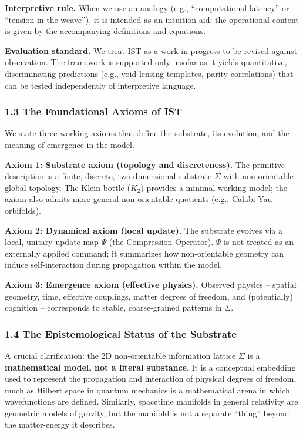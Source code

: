 \documentclass[
]{article}
\begin{document}
\textbf{Interpretive rule.} When we use an analogy (e.g.,
``computational latency'' or ``tension in the weave''), it is intended
as an intuition aid; the operational content is given by the
accompanying definitions and equations.

\textbf{Evaluation standard.} We treat IST as a work in progress to be
revised against observation. The framework is supported only insofar as
it yields quantitative, discriminating predictions (e.g., void-lensing
templates, parity correlations) that can be tested independently of
interpretive language.

\subsubsection{1.3 The Foundational Axioms of
IST}\label{the-foundational-axioms-of-ist}

We state three working axioms that define the substrate, its evolution,
and the meaning of emergence in the model.

\textbf{Axiom 1: Substrate axiom (topology and discreteness).} The
primitive description is a finite, discrete, two-dimensional substrate
\(\Sigma\) with non-orientable global topology. The Klein bottle
(\(K_2\)) provides a minimal working model; the axiom also admits more
general non-orientable quotients (e.g., Calabi-Yau orbifolds).

\textbf{Axiom 2: Dynamical axiom (local update).} The substrate evolves
via a local, unitary update map \(\Psi\) (the Compression Operator).
\(\Psi\) is not treated as an externally applied command; it summarizes
how non-orientable geometry can induce self-interaction during
propagation within the model.

\textbf{Axiom 3: Emergence axiom (effective physics).} Observed physics
-- spatial geometry, time, effective couplings, matter degrees of
freedom, and (potentially) cognition -- corresponds to stable,
coarse-grained patterns in \(\Sigma\).

\subsubsection{1.4 The Epistemological Status of the
Substrate}\label{the-epistemological-status-of-the-substrate}

A crucial clarification: the 2D non-orientable information lattice
\(\Sigma\) is a \textbf{mathematical model, not a literal substance}. It
is a conceptual embedding used to represent the propagation and
interaction of physical degrees of freedom, much as Hilbert space in
quantum mechanics is a mathematical arena in which wavefunctions are
defined. Similarly, spacetime manifolds in general relativity are
geometric models of gravity, but the manifold is not a separate
``thing'' beyond the matter-energy it describes.
\end{document}

